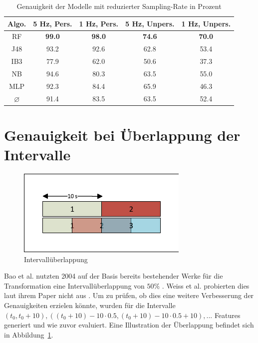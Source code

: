 \begin{table}[h]
	\centering
	\begin{tabular}{|c|c|c||c|c|}
		\hline 
		\textbf{Algo.} & \textbf{5 Hz, Pers.} & \textbf{1 Hz, Pers.} &\textbf{5 Hz, Unpers.} & \textbf{1 Hz, Unpers.} \\ 
		\hline 
		\acs{RF} & \textbf{99.0} & \textbf{98.0} & \textbf{74.6} & \textbf{70.0} \\ 
		\acs{J48} & 93.2 & 92.6 & 62.8 & 53.4 \\ 
		\acs{IB}3 & 77.9 & 62.0 & 50.6 & 37.3 \\ 
		\acs{NB} & 94.6 & 80.3 & 63.5 & 55.0 \\ 
		\acs{MLP} & 92.3 & 84.4 & 65.9 & 46.3 \\ 
		\hline 
		$\varnothing$ & 91.4 & 83.5 & 63.5 & 52.4 \\ 
		\hline
	\end{tabular} 
	\caption{Genauigkeit der Modelle mit reduzierter Sampling-Rate in Prozent}
	\label{tab:accuracy-sampling_rate}
\end{table}

\newpage

\section{Genauigkeit bei Überlappung der Intervalle}
\begin{figure}[htb]
\centering
\includegraphics[clip=true, trim=5mm 5mm 5mm 5mm]{img/interval_overlap}
\caption{Intervallüberlappung}
\label{fig:interval-overlap}
\end{figure}

Bao et al. nutzten 2004 auf der Basis bereits bestehender Werke für die Transformation eine Intervallüberlappung von $50 \%$ \cite{Bao2004}. Weiss et al. probierten dies laut ihrem Paper nicht aus \cite{Weiss2016}. Um zu prüfen, ob dies eine weitere Verbesserung der Genauigkeiten erzielen könnte, wurden für die Intervalle $(t_0, t_0 + 10), ((t_0 + 10) - 10 \cdot 0.5, (t_0 + 10) - 10 \cdot 0.5 + 10), ...$ Features generiert und wie zuvor evaluiert. Eine Illustration der Überlappung befindet sich in Abbildung~\ref{fig:interval-overlap}.

